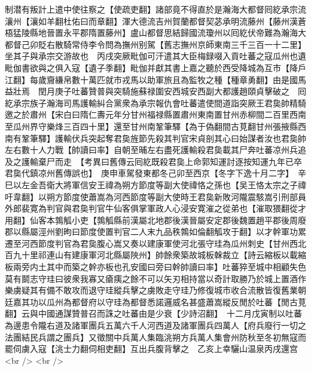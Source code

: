 制潜有叛計上遣中使往察之【使疏吏翻】諸部竟不得直於是瀚海大都督囘紇承宗流瀼州【瀼如羊翻杜佑曰而章翻】渾大德流吉州賀蘭都督契苾承明流藤州【藤州漢蒼梧猛陵縣地晉置永平郡隋置藤州】盧山都督思結歸國流瓊州以囘紇伏帝難為瀚海大都督己卯貶右散騎常侍李令問為撫州别駕【舊志撫州京師東南三千三百一十二里】坐其子與承宗交游故也　丙戌突厥毗伽可汗遣其大臣梅録啜入貢吐蕃之寇瓜州也遺毗伽書欲與之俱入寇【遺子季翻】毗伽并獻其書上嘉之聽於西受降城為互市【降戶江翻】每歲齎縑帛數十萬匹就市戎馬以助軍旅且為監牧之種【種章勇翻】由是國馬益壯焉　閏月庚子吐蕃贊普與突騎施蘇禄圍安西城安西副大都護趙頤貞擊破之　囘紇承宗族子瀚海司馬護輸糾合黨衆為承宗報仇會吐蕃遣使間道詣突厥王君㚟帥精騎邀之於肅州【宋白曰隋仁夀元年分甘州福禄縣置肅州東南置甘州赤柳間二百里西南至瓜州界守樂烽三百四十里】還至甘州南鞏筆驛【為于偽翻間古莧翻甘州張掖縣西南有鞏筆驛】護輸伏兵突起奪君㚟旌節先殺其判官宋貞剖其心曰始謀者汝也君㚟帥左右數十人力戰【帥讀曰率】自朝至晡左右盡死護輸殺君㚟載其尸奔吐蕃凉州兵追及之護輸棄尸而走　【考異曰舊傳云囘紇既殺君㚟上命郭知運討逐按知運九年已卒君㚟代鎮凉州舊傳誤也】　庚申車駕發東都冬己卯至西京【冬字下逸十月二字】　辛巳以左金吾衛大將軍信安王禕為朔方節度等副大使禕恪之孫也【吴王恪太宗之子禕吁韋翻】以朔方節度使蕭嵩為河西節度等副大使時王君㚟新敗河隴震駭嵩引刑部員外郎裴寛為判官與君㚟判官牛仙客俱掌軍政人心浸安寛漼之從弟也【漼取猥翻從才用翻】仙客本鶉觚小吏【鶉觚縣前漢屬北地郡後漢晉屬安定郡後魏置趙平郡後周廢郡以縣屬涇州劉昫曰節度使置判官二人末九品秩鶉如倫翻觚攻于翻】以才幹軍功累遷至河西節度判官為君㚟腹心嵩又奏以建康軍使河北張守珪為瓜州刺史【甘州西北百九十里祁連山有建康軍河北縣屬陜州】帥餘衆築故城板榦裁立【詩云縮板以載縮板兩旁内土其中而築之幹亦板也孔安國曰旁曰幹帥讀曰率】吐蕃猝至城中相顧失色莫有鬬志守珪曰彼衆我寡又瘡痍之餘不可以矢刃相持當以奇計取勝乃於城上置酒作樂虜疑其有備不敢攻而退守珪縱兵擊之虜敗走守珪乃修復城市收合流散皆復舊業朝廷嘉其功以瓜州為都督府以守珪為都督悉諾邏威名甚盛蕭嵩縱反閒於吐蕃【閒古莧翻】云與中國通謀贊普召而誅之吐蕃由是少衰【少詩沼翻】　十二月戊寅制以吐蕃為邊患令隴右道及諸軍團兵五萬六千人河西道及諸軍團兵四萬人【府兵廢行一切之法團結民兵謂之團兵】又徵關中兵萬人集臨洮朔方兵萬人集會州防秋至冬初無寇而罷伺虜入寇【洮士力翻伺相吏翻】互出兵腹背擊之　乙亥上幸驪山温泉丙戌還宫<br />
<br />

